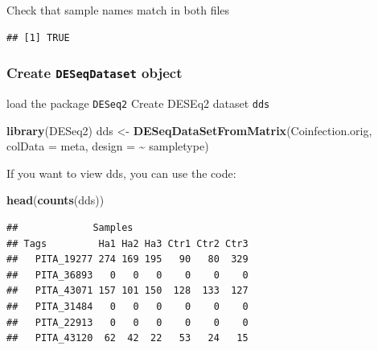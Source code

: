 \documentclass[
]{article}
\newenvironment{Shaded}{\begin{snugshade}}{\end{snugshade}}
\newcommand{\AttributeTok}[1]{\textcolor[rgb]{0.13,0.29,0.53}{#1}}
\newcommand{\FunctionTok}[1]{\textcolor[rgb]{0.13,0.29,0.53}{\textbf{#1}}}
\newcommand{\NormalTok}[1]{#1}
\newcommand{\OtherTok}[1]{\textcolor[rgb]{0.56,0.35,0.01}{#1}}
\newcommand{\SpecialCharTok}[1]{\textcolor[rgb]{0.81,0.36,0.00}{\textbf{#1}}}
\begin{document}
Check that sample names match in both files

\begin{Shaded}
\end{Shaded}

\begin{verbatim}
## [1] TRUE
\end{verbatim}

\subsubsection{\texorpdfstring{Create \texttt{DESeqDataset}
object}{Create DESeqDataset object}}\label{create-deseqdataset-object}

load the package \texttt{DESeq2} Create DESEq2 dataset \texttt{dds}

\begin{Shaded}
\begin{Highlighting}[]
\FunctionTok{library}\NormalTok{(DESeq2)}
\NormalTok{dds }\OtherTok{\textless{}{-}} \FunctionTok{DESeqDataSetFromMatrix}\NormalTok{(Coinfection.orig, }\AttributeTok{colData =}\NormalTok{ meta, }\AttributeTok{design =} \SpecialCharTok{\textasciitilde{}}\NormalTok{ sampletype)}
\end{Highlighting}
\end{Shaded}

If you want to view dds, you can use the code:

\begin{Shaded}
\begin{Highlighting}[]
\FunctionTok{head}\NormalTok{(}\FunctionTok{counts}\NormalTok{(dds))}
\end{Highlighting}
\end{Shaded}

\begin{verbatim}
##             Samples
## Tags         Ha1 Ha2 Ha3 Ctr1 Ctr2 Ctr3
##   PITA_19277 274 169 195   90   80  329
##   PITA_36893   0   0   0    0    0    0
##   PITA_43071 157 101 150  128  133  127
##   PITA_31484   0   0   0    0    0    0
##   PITA_22913   0   0   0    0    0    0
##   PITA_43120  62  42  22   53   24   15
\end{verbatim}
\end{document}
